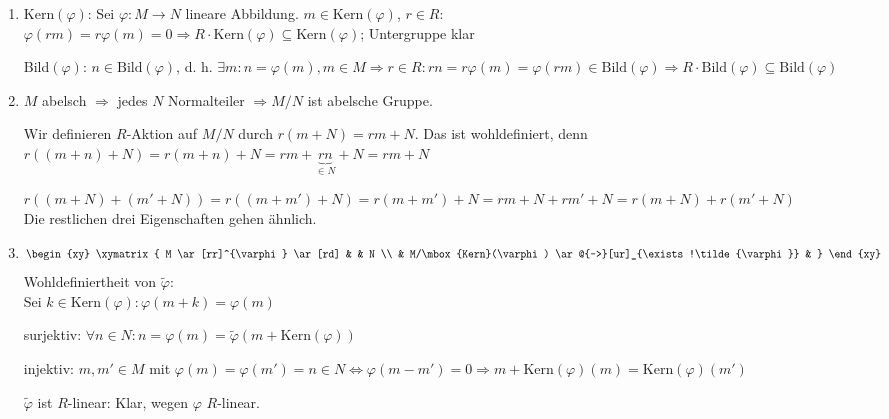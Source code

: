 \begin{Bew}
  \begin{enumerate}
    \item Kern$(\varphi)$: Sei $\varphi: M \rightarrow N$ lineare Abbildung. $m \in \mbox{Kern} (\varphi)$, $r \in R$:\\
          $\varphi(rm) = r\varphi(m) = 0 \Rightarrow R \cdot \mbox{Kern} (
          \varphi ) \subseteq \mbox{Kern} (\varphi)$; Untergruppe klar

	  Bild$(\varphi)$: $n \in \mbox{Bild} (\varphi) $, d. h. $\exists m: n = \varphi
   	  (m), m \in M \Rightarrow r \in R:
	  rn = r \varphi(m) = \varphi(rm) \in \mbox{Bild} (\varphi)  \Rightarrow R
	  \cdot \mbox{Bild} (\varphi) \subseteq \mbox{Bild} (\varphi)$
    \item $M$ abelsch $\Rightarrow$ jedes $N$ Normalteiler $\Rightarrow M/N$ ist
          abelsche Gruppe.

    	  Wir definieren $R$-Aktion auf $M/N$ durch $r(m + N) = rm + N$. Das ist 
    	  wohldefiniert, denn\\
	  $r((m+n)+N)=r(m+n) + N= rm + \underbrace{rn}_{\in N} + N = rm + N$

	  $r((m+N) + (m' + N ) ) = r((m+m')+N) = r(m+m') + N = rm + N + rm' + N =
	  r(m+N) + r(m'+N)$\\
	  Die restlichen drei Eigenschaften gehen ähnlich.
	  
    \item
	$$\begin{xy}
              \xymatrix{
                M \ar[rr]^{\varphi} \ar[rd] &     &  N \\
                                            &  M/\mbox{Kern}(\varphi) \ar@{-->}[ur]_{\exists!\tilde{\varphi}}  & }
          \end{xy}$$
	  Wohldefiniertheit von $\tilde{\varphi}$:\\
	  Sei $k \in \textrm{Kern}(\varphi): \varphi(m+k) = \varphi(m)$

	  surjektiv: $\forall n \in N: n = \varphi(m) = \tilde{\varphi}(m+ 
	  \mbox{Kern}(\varphi))$

	  injektiv: $m, m' \in M$ mit $\varphi(m) = \varphi(m') = n \in N \Leftrightarrow 
	  \varphi(m-m') = 0 \Rightarrow m + \mbox{Kern}(\varphi)(m) = 
	  \mbox{Kern}(\varphi)(m')$

	  $\tilde{\varphi}$ ist $R$-linear: Klar, wegen $\varphi$ $R$-linear.
  \end{enumerate}
\end{Bew}

